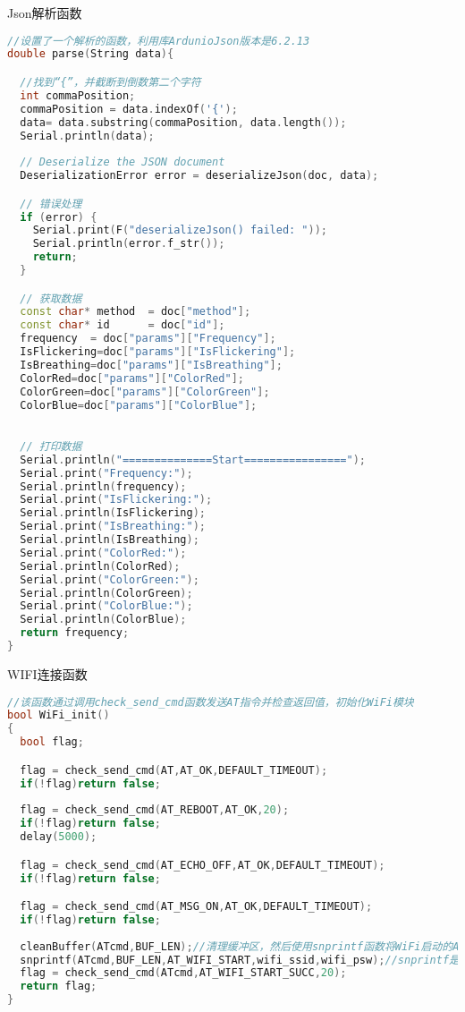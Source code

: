 \documentclass[12pt,hyperref,a4paper,UTF8]{ctexart}
\begin{document}
Json解析函数
\begin{lstlisting}[language=C++]
    //设置了一个解析的函数，利用库ArdunioJson版本是6.2.13
double parse(String data){

  //找到“{”，并截断到倒数第二个字符
  int commaPosition;  
  commaPosition = data.indexOf('{');
  data= data.substring(commaPosition, data.length());
  Serial.println(data);
  
  // Deserialize the JSON document
  DeserializationError error = deserializeJson(doc, data);

  // 错误处理
  if (error) {
    Serial.print(F("deserializeJson() failed: "));
    Serial.println(error.f_str());
    return;
  }

  // 获取数据
  const char* method  = doc["method"];
  const char* id      = doc["id"];
  frequency  = doc["params"]["Frequency"];
  IsFlickering=doc["params"]["IsFlickering"];
  IsBreathing=doc["params"]["IsBreathing"];
  ColorRed=doc["params"]["ColorRed"];
  ColorGreen=doc["params"]["ColorGreen"];
  ColorBlue=doc["params"]["ColorBlue"];
  

  // 打印数据
  Serial.println("==============Start================");
  Serial.print("Frequency:");
  Serial.println(frequency);
  Serial.print("IsFlickering:");
  Serial.println(IsFlickering);
  Serial.print("IsBreathing:");
  Serial.println(IsBreathing);
  Serial.print("ColorRed:");
  Serial.println(ColorRed);
  Serial.print("ColorGreen:");
  Serial.println(ColorGreen);
  Serial.print("ColorBlue:");
  Serial.println(ColorBlue);
  return frequency;
}
\end{lstlisting}

WIFI连接函数
\begin{lstlisting}[language=C++]
    //该函数通过调用check_send_cmd函数发送AT指令并检查返回值，初始化WiFi模块
bool WiFi_init()
{
  bool flag;

  flag = check_send_cmd(AT,AT_OK,DEFAULT_TIMEOUT);
  if(!flag)return false;
  
  flag = check_send_cmd(AT_REBOOT,AT_OK,20);
  if(!flag)return false;
  delay(5000);

  flag = check_send_cmd(AT_ECHO_OFF,AT_OK,DEFAULT_TIMEOUT);
  if(!flag)return false;

  flag = check_send_cmd(AT_MSG_ON,AT_OK,DEFAULT_TIMEOUT);
  if(!flag)return false;
  
  cleanBuffer(ATcmd,BUF_LEN);//清理缓冲区，然后使用snprintf函数将WiFi启动的AT命令、WiFi的SSID和密码格式化到ATcmd缓冲区。
  snprintf(ATcmd,BUF_LEN,AT_WIFI_START,wifi_ssid,wifi_psw);//snprintf是一个C语言中的函数，用于将格式化的数据写入字符串
  flag = check_send_cmd(ATcmd,AT_WIFI_START_SUCC,20);
  return flag;
}
\end{lstlisting}
\end{document}
